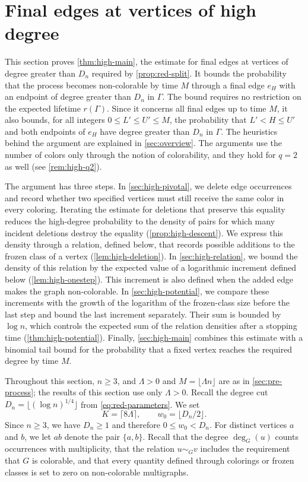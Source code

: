\chapter{Final edges at vertices of high degree}\label{sec:high}

This section proves \cref{thm:high-main}, the estimate for final edges at vertices of degree greater than $D_n$ required by \cref{prop:red-split}. It bounds the probability that the process becomes non-colorable by time $M$ through a final edge $e_H$ with an endpoint of degree greater than $D_n$ in $\Gamma$. The bound requires no restriction on the expected lifetime $r(\Gamma)$. Since it concerns all final edges up to time $M$, it also bounds, for all integers $0 \le L' \le U' \le M$, the probability that $L' < H \le U'$ and both endpoints of $e_H$ have degree greater than $D_n$ in $\Gamma$. The heuristics behind the argument are explained in \cref{sec:overview}. The arguments use the number of colors only through the notion of colorability, and they hold for $q = 2$ as well (see \cref{rem:high-q2}).

The argument has three steps. In \cref{sec:high-pivotal}, we delete edge occurrences and record whether two specified vertices must still receive the same color in every coloring. Iterating the estimate for deletions that preserve this equality reduces the high-degree probability to the density of pairs for which many incident deletions destroy the equality (\cref{prop:high-descent}). We express this density through a relation, defined below, that records possible additions to the frozen class of a vertex (\cref{lem:high-deletion}). In \cref{sec:high-relation}, we bound the density of this relation by the expected value of a logarithmic increment defined below (\cref{lem:high-onestep}). This increment is also defined when the added edge makes the graph non-colorable. In \cref{sec:high-potential}, we compare these increments with the growth of the logarithm of the frozen-class size before the last step and bound the last increment separately. Their sum is bounded by $\log n$, which controls the expected sum of the relation densities after a stopping time (\cref{thm:high-potential}). Finally, \cref{sec:high-main} combines this estimate with a binomial tail bound for the probability that a fixed vertex reaches the required degree by time $M$.

Throughout this section, $n \ge 3$, and $\Lambda > 0$ and $M = \lfloor \Lambda n \rfloor$ are as in \cref{sec:pre-process}; the results of this section use only $\Lambda > 0$. Recall the degree cut $D_n = \lfloor (\log n)^{1/4} \rfloor$ from \eqref{eq:red-parameters}. We set
\begin{equation}\label{eq:high-params}
K = \lceil 8 \Lambda \rceil, \qquad w_0 = \lfloor D_n / 2 \rfloor.
\end{equation}
Since $n \ge 3$, we have $D_n \ge 1$ and therefore $0 \le w_0 < D_n$. For distinct vertices $a$ and $b$, we let $ab$ denote the pair $\{a, b\}$. Recall that the degree $\deg_G(u)$ counts occurrences with multiplicity, that the relation $u \sim_G v$ includes the requirement that $G$ is colorable, and that every quantity defined through colorings or frozen classes is set to zero on non-colorable multigraphs.

